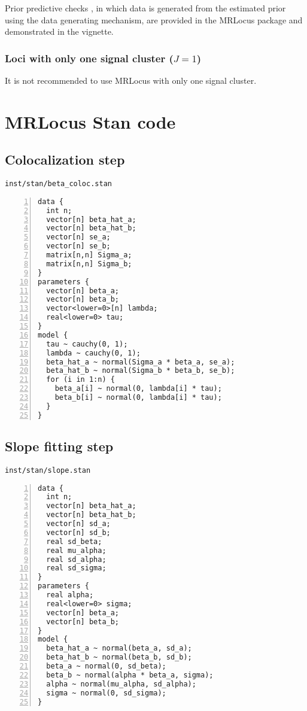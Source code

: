 \documentclass[11pt]{article}
\begin{document}
Prior predictive checks \citep{Gabry2019}, in which data is generated
from the estimated prior using the data generating mechanism, are
provided in the MRLocus package and demonstrated in the vignette.

\subsubsection{Loci with only one signal cluster ($J=1$)}

It is not recommended to use MRLocus with only one signal cluster.

\newpage

\section{MRLocus Stan code}

\subsection{Colocalization step}

\texttt{inst/stan/beta\_coloc.stan}

\begin{Verbatim}[frame=single,numbers=left]
data {
  int n;
  vector[n] beta_hat_a;
  vector[n] beta_hat_b;
  vector[n] se_a;
  vector[n] se_b;
  matrix[n,n] Sigma_a;
  matrix[n,n] Sigma_b;
}
parameters {
  vector[n] beta_a;
  vector[n] beta_b;
  vector<lower=0>[n] lambda;
  real<lower=0> tau;
}
model {
  tau ~ cauchy(0, 1);
  lambda ~ cauchy(0, 1);
  beta_hat_a ~ normal(Sigma_a * beta_a, se_a);
  beta_hat_b ~ normal(Sigma_b * beta_b, se_b);
  for (i in 1:n) {
    beta_a[i] ~ normal(0, lambda[i] * tau);
    beta_b[i] ~ normal(0, lambda[i] * tau);
  }
}
\end{Verbatim}

\newpage

\subsection{Slope fitting step}

\texttt{inst/stan/slope.stan}

\begin{Verbatim}[frame=single,numbers=left]
data {
  int n; 
  vector[n] beta_hat_a;
  vector[n] beta_hat_b;
  vector[n] sd_a;
  vector[n] sd_b;
  real sd_beta;
  real mu_alpha;
  real sd_alpha;
  real sd_sigma;
}
parameters {
  real alpha;
  real<lower=0> sigma;
  vector[n] beta_a;
  vector[n] beta_b;
}
model {
  beta_hat_a ~ normal(beta_a, sd_a);
  beta_hat_b ~ normal(beta_b, sd_b);
  beta_a ~ normal(0, sd_beta);
  beta_b ~ normal(alpha * beta_a, sigma);
  alpha ~ normal(mu_alpha, sd_alpha);
  sigma ~ normal(0, sd_sigma);
}
\end{Verbatim}

\newpage


\end{document}
